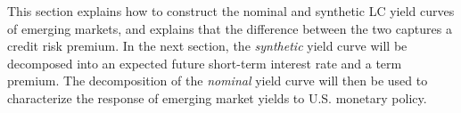 This section explains how to construct the nominal and synthetic LC yield curves of emerging markets, and explains that
the difference between the two captures a credit risk premium.
In the next section, the \textit{synthetic} yield curve will be decomposed into an expected future short-term interest rate and a term premium. 
The decomposition of the \textit{nominal} yield curve will then be used to characterize the response of emerging market yields to U.S. monetary policy.

